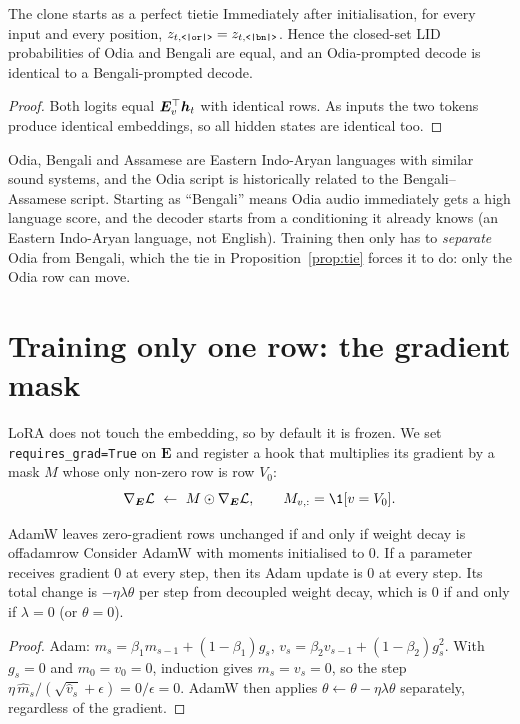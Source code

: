 \begin{proposition}{The clone starts as a perfect tie}{tie}
Immediately after initialisation, for every input and every position, $z_{t,\tok{or}}=z_{t,\tok{bn}}$. Hence the closed-set LID
probabilities of Odia and Bengali are equal, and an Odia-prompted decode is identical to a Bengali-prompted decode.
\end{proposition}
\begin{proof}
Both logits equal $\bm E_v^\top\bm{h}_t$ with identical rows. As inputs the two tokens produce identical embeddings, so all hidden
states are identical too.
\end{proof}

\begin{intuition}
Odia, Bengali and Assamese are Eastern Indo-Aryan languages with similar sound systems, and the Odia script is historically related
to the Bengali--Assamese script. Starting as ``Bengali'' means Odia audio immediately gets a high language score, and the decoder
starts from a conditioning it already knows (an Eastern Indo-Aryan language, not English). Training then only has to \emph{separate}
Odia from Bengali, which the tie in Proposition~\ref{prop:tie} forces it to do: only the Odia row can move.
\end{intuition}

\section{Training only one row: the gradient mask}

LoRA does not touch the embedding, so by default it is frozen. We set \texttt{requires\_grad=True} on $\bm E$ and register a hook that
multiplies its gradient by a mask $M$ whose only non-zero row is row $V_0$:
\[
\nabla_{\bm E}\mathcal L\ \leftarrow\ M\odot\nabla_{\bm E}\mathcal L,\qquad M_{v,:}=\1[v=V_0].
\]

\begin{proposition}{AdamW leaves zero-gradient rows unchanged if and only if weight decay is off}{adamrow}
Consider AdamW with moments initialised to $0$. If a parameter receives gradient $0$ at every step, then its Adam update is $0$ at
every step. Its total change is $-\eta\lambda\theta$ per step from decoupled weight decay, which is $0$ if and only if
$\lambda=0$ (or $\theta=0$).
\end{proposition}
\begin{proof}
Adam: $m_s=\beta_1m_{s-1}+(1-\beta_1)g_s$, $v_s=\beta_2v_{s-1}+(1-\beta_2)g_s^2$. With $g_s=0$ and $m_0=v_0=0$, induction gives
$m_s=v_s=0$, so the step $\eta\,\hat m_s/(\sqrt{\hat v_s}+\epsilon)=0/\epsilon=0$. AdamW then applies $\theta\leftarrow\theta-\eta\lambda\theta$
separately, regardless of the gradient.
\end{proof}

